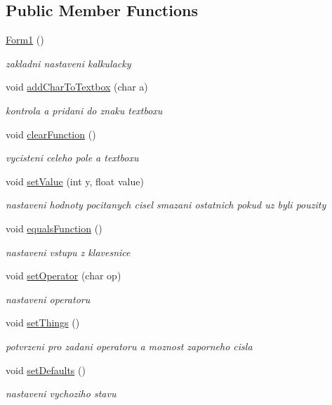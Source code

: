 \subsection*{Public Member Functions}
\begin{DoxyCompactItemize}
\item 
\hyperlink{class_calculator_1_1_form1_a095b483116463d21326329c5b0427d04}{Form1} ()
\begin{DoxyCompactList}\small\item\em zakladni nastaveni kalkulacky \end{DoxyCompactList}\item 
void \hyperlink{class_calculator_1_1_form1_a1b98650937b3ca663bebdf5956c1d0ee}{add\+Char\+To\+Textbox} (char a)
\begin{DoxyCompactList}\small\item\em kontrola a pridani do znaku textboxu \end{DoxyCompactList}\item 
void \hyperlink{class_calculator_1_1_form1_a5197b700927d7cd8c4408f8a033f6c31}{clear\+Function} ()
\begin{DoxyCompactList}\small\item\em vycisteni celeho pole a textboxu \end{DoxyCompactList}\item 
void \hyperlink{class_calculator_1_1_form1_a0e349ae0eec13af39bd03c97d5f63110}{set\+Value} (int y, float value)
\begin{DoxyCompactList}\small\item\em nastaveni hodnoty pocitanych cisel smazani ostatnich pokud uz byli pouzity \end{DoxyCompactList}\item 
void \hyperlink{class_calculator_1_1_form1_a77b79cdc88b91b57427780d80d8e2f74}{equals\+Function} ()
\begin{DoxyCompactList}\small\item\em nastaveni vstupu z klavesnice \end{DoxyCompactList}\item 
void \hyperlink{class_calculator_1_1_form1_ad9f716fe86d8d2d03a50f93488f52368}{set\+Operator} (char op)
\begin{DoxyCompactList}\small\item\em nastaveni operatoru \end{DoxyCompactList}\item 
void \hyperlink{class_calculator_1_1_form1_a6b3fab065d9c21db2311ddfac505ba7e}{set\+Things} ()
\begin{DoxyCompactList}\small\item\em potvrzeni pro zadani operatoru a moznost zaporneho cisla \end{DoxyCompactList}\item 
void \hyperlink{class_calculator_1_1_form1_a8517e0865c2b1cba341f7d8f2eec4a3d}{set\+Defaults} ()
\begin{DoxyCompactList}\small\item\em nastaveni vychoziho stavu \end{DoxyCompactList}\end{DoxyCompactItemize}
